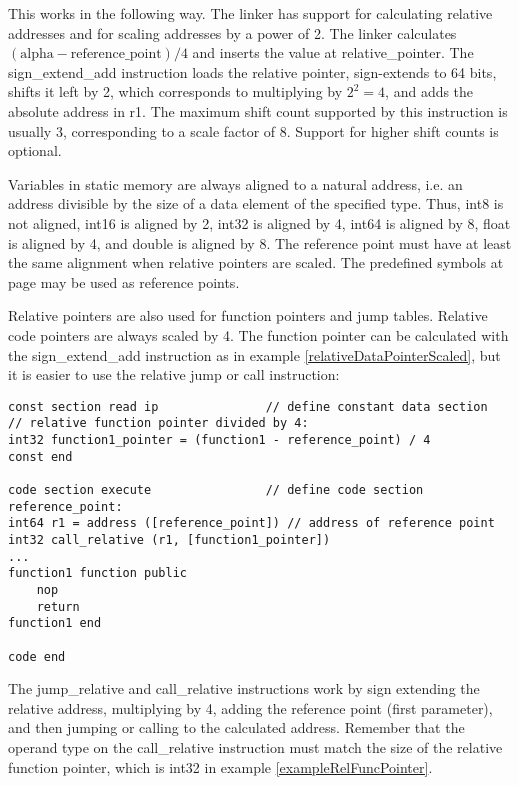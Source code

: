 \documentclass[forwardcom.tex]{subfiles}
\begin{document}
This works in the following way. The linker has support for calculating relative addresses and for scaling addresses by a power of 2. The linker calculates 
$(\mathrm{alpha} - \mathrm{reference\_point}) / 4$ and inserts the value at 
relative\_pointer. 
The sign\_extend\_add instruction loads the relative pointer, sign-extends to 64 bits, shifts it left by 2, which corresponds to multiplying by $2^2 = 4$, and adds the absolute address in r1. The maximum shift count supported by this instruction is usually 3, corresponding to a scale factor of 8. Support for higher shift counts is optional.
\vv

Variables in static memory are always aligned to a natural address, i.e. an address divisible by the size of a data element of the specified type. Thus, int8 is not aligned, int16 is aligned by 2, int32 is aligned by 4, int64 is aligned by 8, float is aligned by 4, and double is aligned by 8. The reference point must have at least the same alignment when relative pointers are scaled. The predefined symbols at page \pageref{SpecialAddressSymbols} may be used as reference points.
\vspace{4mm}


Relative pointers are also used for function pointers and jump tables. Relative code pointers are always scaled by 4. The function pointer can be calculated with the sign\_extend\_add instruction as in example \ref{relativeDataPointerScaled}, but it is easier to use the relative jump or call instruction:

\begin{example}
\label{exampleRelFuncPointer}
\end{example}
\begin{lstlisting}[frame=single]
const section read ip               // define constant data section
// relative function pointer divided by 4:
int32 function1_pointer = (function1 - reference_point) / 4
const end

code section execute                // define code section
reference_point:
int64 r1 = address ([reference_point]) // address of reference point
int32 call_relative (r1, [function1_pointer])
...
function1 function public
    nop
    return
function1 end

code end
\end{lstlisting}
\vv

The jump\_relative and call\_relative instructions work by sign extending the relative address, multiplying by 4, adding the reference point (first parameter), and then jumping or calling to the calculated address. Remember that the operand type on the call\_relative instruction must match the size of the relative function pointer, which is int32 in example \ref{exampleRelFuncPointer}.
\vv
\end{document}
